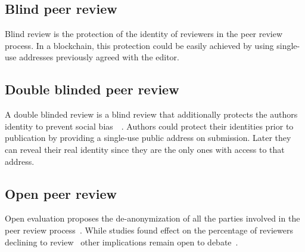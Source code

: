 

\subsection*{Blind peer review}
Blind review is the protection of the identity of reviewers in the peer review
process. In a blockchain, this protection could be easily achieved by using
single-use addresses previously agreed with the editor.

\subsection*{Double blinded peer review}
A double blinded review is a blind review that additionally protects the authors
identity to prevent social bias~\cite{lee2013bias}~\cite{budden2008double}.
Authors could protect their identities prior to publication by providing a
single-use public address on submission. Later they can reveal their real
identity since they are the only ones with access to that address.

\subsection*{Open peer review}
Open evaluation proposes the de-anonymization of all the parties involved in the
peer review process~\cite{ford2013defining}. While studies found effect on the
percentage of reviewers declining to review~\cite{van1999effect} other
implications remain open to debate~\cite{groves2010open}.


